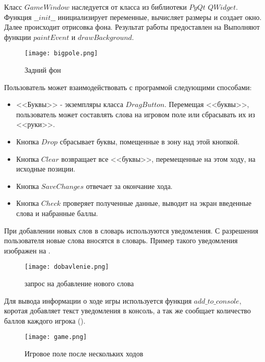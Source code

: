 \documentclass[a4paper,14pt]{article}
\begin{document}
	Класс $GameWindow$ наследуется от класса из библиотеки $PyQt$ $QWidget$.	
	Функция $\_\_init\_\_$  инициализирует переменные, вычисляет размеры и создает окно.	
	Далее происходит отрисовка фона.
	Результат работы предоставлен на 
	Выполняют функции $paintEvent$ и $drawBackground$.
	\begin{figure}[H]
		\centering
		\texttt{[image: bigpole.png]}
		\caption{Задний фон}
		\label{img:background}
	\end{figure}
	
	 Пользователь может взаимодействовать с программой следующими способами: 
	 \begin {itemize}
	 \item <<Буквы>> - экземпляры класса $DragButton$. Перемещая <<буквы>>, пользователь может составлять слова на игровом поле или сбрасывать их из <<руки>>.
	 \item Кнопка $Drop$ сбрасывает буквы, помещенные в зону над этой кнопкой.
	 \item Кнопка $Clear$ возвращает все <<буквы>>, перемещенные на этом ходу, на исходные позиции.
	 \item Кнопка $Save Changes$ отвечает за окончание хода.
	 \item Кнопка $Check$ проверяет полученные данные, выводит на экран введенные слова и набранные баллы.
	 \end{itemize}	
	 
	 При добавлении новых слов в словарь используются уведомления. С разрешения пользователя новые слова вносятся в словарь. Пример такого уведомления изображен на .
	\begin{figure}[bhtp]
		\centering
		\texttt{[image: dobavlenie.png]}
		\caption{запрос на добавление нового слова}
		\label{img:dob}
	\end{figure}
		
	Для вывода информации о ходе игры используется функция $add\_to\_console$, коротая добавляет текст уведомления в консоль, а так же сообщает количество баллов каждого игрока ().

	\begin{figure}[H]
		\centering
		\texttt{[image: game.png]}
		\caption{Игровое поле после нескольких ходов}
		\label{img:game}
	\end{figure}
\end{document}
